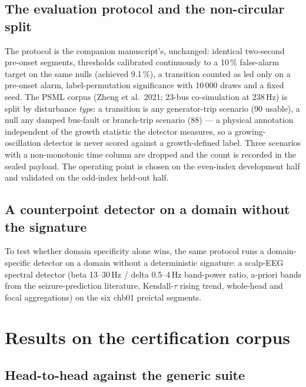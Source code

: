 \documentclass[11pt]{article}
\begin{document}
\subsection{The evaluation protocol and the non-circular split}

The protocol is the companion manuscript's, unchanged: identical
two-second pre-onset segments, thresholds calibrated continuously to a
10\,\% false-alarm target on the same nulls (achieved 9.1\,\%), a
transition counted as led only on a pre-onset alarm, label-permutation
significance with 10\,000 draws and a fixed seed. The PSML corpus
(Zheng et al.\ 2021; 23-bus co-simulation at 238\,Hz) is split by
disturbance \emph{type}: a transition is any generator-trip scenario
(90 usable), a null any damped bus-fault or branch-trip scenario (88)
--- a physical annotation independent of the growth statistic the
detector measures, so a growing-oscillation detector is never scored
against a growth-defined label. Three scenarios with a non-monotonic
time column are dropped and the count is recorded in the sealed
payload. The operating point is chosen on the even-index development
half and validated on the odd-index held-out half.

\subsection{A counterpoint detector on a domain without the signature}

To test whether domain specificity alone wins, the same protocol runs a
domain-specific detector on a domain without a deterministic signature:
a scalp-EEG spectral detector (beta 13--30\,Hz / delta 0.5--4\,Hz
band-power ratio, a-priori bands from the seizure-prediction
literature, Kendall-$\tau$ rising trend, whole-head and focal
aggregations) on the six chb01 preictal segments.

\section{Results on the certification corpus}\label{sec:grid}

\subsection{Head-to-head against the generic suite}
\end{document}

